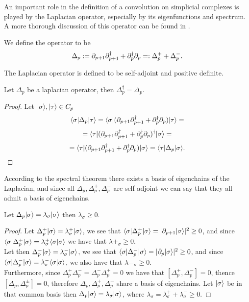 \documentclass[../1.tex]{subfiles}
\begin{document}
    An important role in the definition of a convolution on simplicial complexes is played by the Laplacian operator,
    especially by its eigenfunctions and spectrum. A more thorough discussion of this operator can be found in \cite{laplacian}.
    
    \begin{defn}
        We define the  operator to be 
        \[ \Delta_p := \partial_{p+1}\partial^\dagger_{p+1} + \partial^\dagger_p\partial_p =: \Delta^+_p + \Delta^-_p.\]
    \end{defn}

    The Laplacian operator is defined to be self-adjoint and positive definite.

    \begin{prop}
        Let $\Delta_p$ be a laplacian operator, then $\Delta^\dagger_p = \Delta_p.$
    \end{prop}
    \begin{proof}
        Let $| \sigma \rangle, | \tau \rangle \in C_p$ 
        \[ \langle \sigma |\Delta_p| \tau \rangle=\langle \sigma |(\partial_{p+1}\partial^\dagger_{p+1} + \partial^\dagger_p\partial_p)| \tau \rangle = \]
        \[ = \langle \tau |(\partial_{p+1}\partial^\dagger_{p+1} + \partial^\dagger_p\partial_p)^\dagger| \sigma \rangle = \]
        \[ = \langle \tau |(\partial_{p+1}\partial^\dagger_{p+1} + \partial^\dagger_p\partial_p)| \sigma \rangle = \langle \tau |\Delta_p| \sigma \rangle. \qedhere \]
    \end{proof}

    According to the spectral theorem there exists a basis of eigenchains of the Laplacian, and since all $\Delta_p, \Delta^+_p, \Delta^-_p$
    are self-adjoint we can say that they all admit a basis of eigenchains.

    \begin{prop}
        Let $\Delta_p| \sigma \rangle = \lambda_\sigma| \sigma \rangle$ then $\lambda_\sigma \geq 0$.
    \end{prop}
    \begin{proof}
        Let $\Delta^+_p| \sigma \rangle = \lambda^+_\sigma | \sigma \rangle$, we see that $\langle \sigma |\Delta^+_p| \sigma \rangle = | \partial_{p+1}| \sigma \rangle |^2 \geq 0$, and since
        $\langle \sigma |\Delta^+_p| \sigma \rangle = \lambda^+_\sigma\langle \sigma | \sigma \rangle$ we have that $\lambda+_\sigma \geq 0.$\\
        Let then $\Delta^-_p| \sigma \rangle = \lambda^-_\sigma | \sigma \rangle$, we see that $\langle \sigma |\Delta^-_p| \sigma \rangle = | \partial_p | \sigma \rangle |^2 \geq 0$, and since
        $\langle \sigma |\Delta^-_p| \sigma \rangle = \lambda^-_\sigma\langle \sigma | \sigma \rangle$, we also have that $\lambda-_\sigma \geq 0.$\\
        Furthermore, since $\Delta^+_p\Delta^-_p = \Delta^-_p\Delta^+_p = 0$ we have that $[\Delta^+_p,\Delta^-_p] = 0$, thence
        $[\Delta_p, \Delta^\pm_p] = 0$, therefore $\Delta_p, \Delta^+_p, \Delta^-_p$ share a basis of eigenchains.
        Let $| \sigma \rangle$ be in that common basis then $\Delta_p| \sigma \rangle = \lambda_\sigma| \sigma \rangle$, where
        $\lambda_\sigma = \lambda^+_\sigma + \lambda^-_\sigma \geq 0$. \qedhere
    \end{proof}
\end{document}
